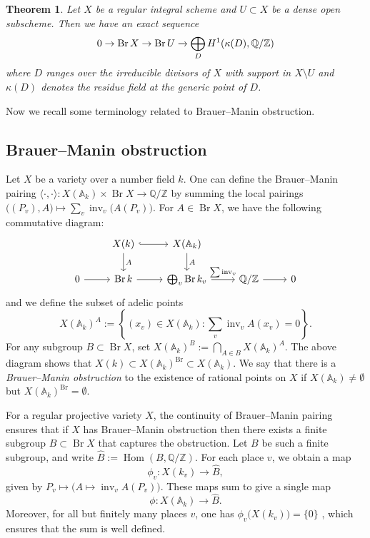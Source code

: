 \documentclass[11pt]{amsart}
\theoremstyle{plain}
\newtheorem{theorem}[thm]{Theorem}
\theoremstyle{definition}
\newcommand{\A}{{\mathbb A}}
\newcommand{\Q}{{\mathbb Q}}
\newcommand{\Z}{{\mathbb Z}}
\DeclareMathOperator{\Br}{Br}
\begin{document}
\begin{theorem}
   Let $X$ be a regular integral scheme and $U\subset X$ be a dense open subscheme. Then we have an exact sequence
     \begin{equation*}\label{purity2}
    0\rightarrow\Br X\rightarrow\Br U\xrightarrow\displaystyle\bigoplus_{D}H^1(\kappa(D),\Q/\Z)
	\end{equation*}
    where $D$ ranges over the irreducible divisors of $X$ with support in $X\setminus U$ and $\kappa(D)$ denotes the residue field at the generic point of $D$.
\end{theorem}
    Now we recall some terminology related to Brauer--Manin obstruction.
\subsection{Brauer--Manin obstruction}
Let $X$ be a variety over a number field $k$. One can define the Brauer--Manin pairing \( \langle \cdot, \cdot \rangle : X(\mathbb{A}_k) \times \Br X \rightarrow \Q/\Z \) by summing the local pairings
\(\big((P_v), A\big) \mapsto \sum_v \operatorname{inv}_v \big(A(P_v)\big)\). For $A \in \Br X$, we have the following commutative diagram:
\[
\begin{tikzcd}
& X(k) \arrow[r, hook] \arrow[d,"A"] & X(\A_k) \arrow[d,"A"] & & \\
0 \arrow[r] & \Br k \arrow[r] & \bigoplus_{v} \Br k_{v} \arrow[r, "\sum \operatorname{inv}_{v}"] & \Q/\Z \arrow[r] & 0
\end{tikzcd}
\]
and we define the subset of adelic points \[X(\A_k)^A := \left\{ (x_v) \in X(\A_k) : \sum_v \operatorname{inv}_v A(x_v) = 0 \right\}.\]
For any subgroup $B \subset \Br X$, set \( X(\A_k)^B := \bigcap_{A \in B} X(\A_k)^A\). The above diagram shows that \(X(k)\subset X(\A_k)^{\Br} \subset X(\A_k)\). We say that there is a \emph{Brauer--Manin obstruction} to the existence of rational points on $X$ if $X(\A_k) \neq \emptyset$ but $X(\A_k)^{\Br} = \emptyset$.

 For a regular projective variety $X$, the continuity of Brauer--Manin pairing ensures that if $X$ has Brauer--Manin obstruction then there exists a finite subgroup $B \subset \Br X$ that captures the obstruction.
Let $B$ be such a finite subgroup, and write $\hat{B} := \operatorname{Hom}(B, \Q/\Z)$. For each place $v$, we obtain a map
\[
\phi_v : X(k_v) \to \hat{B},\] 
given by $P_v \mapsto \big(A \mapsto \operatorname{inv}_v A(P_v)\big).$
These maps sum to give a single map
\[
\phi : X(\A_k) \rightarrow \hat{B}.
\]
Moreover, for all but finitely many places $v$, one has $\phi_v\big(X(k_v)\big) = \{0\}$ \cite[Proposition ~13.3.1]{BG}, which ensures that the sum is well defined.
\end{document}
